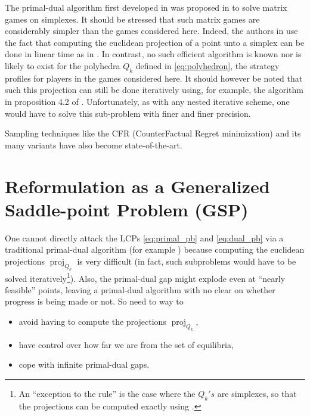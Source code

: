 \documentclass[envcountsame]{llcns2e/llncs}
\DeclareMathOperator{\proj}{proj}
\begin{document}
The primal-dual algorithm first developed in \cite{chambolle2010} was
proposed \cite{chambolle2014ergodic} in to solve matrix games on
simplexes. It should be stressed that such matrix games are
considerably simpler than the games considered here. Indeed, the
authors in \cite{chambolle2014ergodic} use the fact that computing the
euclidean projection of a point unto a simplex can be done in linear
time as in \cite{duchi2008efficient}. In contrast, no such efficient
algorithm is known nor is likely to exist for the polyhedra $Q_k$
defined in \eqref{eq:polyhedron}, the strategy profiles for players in
the games considered here. It should however be noted that such this
projection can still be done iteratively using, for example, the
algorithm in proposition 4.2 of \cite{combettes2010dualization}%
. Unfortunately, as
with any nested iterative scheme, one would have to solve this
sub-problem with finer and finer precision.


Sampling techniques like the CFR (CounterFactual Regret minimization)
and its many variants
\cite{MartinZinkevichNIPS2007,lanctot2009monte,Bowling09012015} have
also become state-of-the-art.


\section{Reformulation as a Generalized Saddle-point Problem (GSP)}
\label{sec:gsp}
One cannot directly attack the LCPs \eqref{eq:primal_pb} and
\eqref{eq:dual_pb} via a traditional primal-dual algorithm
(for example \cite{chambolle2010,chambolle2014ergodic}) because
computing the euclidean projections $\proj_{Q_k}$ is very difficult
(in fact, such subproblems would have to be solved
iteratively\footnote{An ``exception to the rule'' is the case where
  the $Q_k's$ are simplexes, so that the projections can be computed
  exactly using \cite{duchi2008efficient}.}). Also,
the primal-dual gap might explode even at ``nearly feasible'' points,
leaving a primal-dual algorithm with no clear on whether progress is
being made or not. So need to way to
\begin{itemize}
\item avoid having to compute the projections $\proj_{Q_k}$,
\item have control over how far we are from the set of equilibria,
\item cope  with infinite primal-dual gaps.
\end{itemize}
\end{document}
